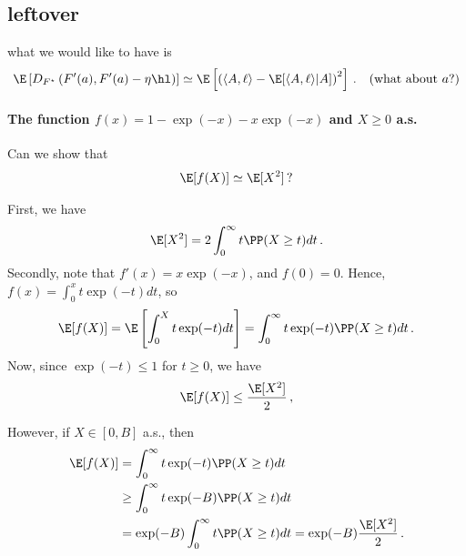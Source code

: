 \subsection{leftover}
what we would like to have is
\begin{align*}
    \E\left[D_{F^\star}\left(F'(a), F'(a) - \eta \hl\right)\right]
                        & \simeq
    \E\left[\left(
        \langle A, \ell \rangle
        -
        \E[
            \langle A, \ell \rangle | A
        ]
    \right)^2\right]\,. & (\text{what about }a?)
\end{align*}
\begin{center}
\end{center}
\paragraph{The function $f(x) = 1 - \exp(-x) - x \exp(-x)$ and $X \geq 0$ a.s.}
Can we show that
\begin{align*}
    \E[f(X)] \simeq \E[X^2]\,?
\end{align*}

First, we have
\begin{align*}
    \E[X^2] = 2 \int_{0}^{\infty} t \PP(X \geq t) dt\,.
\end{align*}
Secondly, note that $f'(x) = x \exp(-x)$, and $f(0) = 0$. Hence,
$f(x) = \int_{0}^x t \exp(-t) dt$, so
\begin{align*}
    \E[f(X)]
    = \E\left[
        \int_0^X t \exp(-t) dt
        \right]
    = \int_0^\infty t \exp(-t) \PP(X \geq t) dt\,.
\end{align*}
Now, since $\exp(-t) \leq 1$ for $t \geq 0$, we have
\begin{align*}
    \E[f(X)] \leq \frac{\E[X^2]}{2}\,,
\end{align*}

However, if $X \in [0, B]$ a.s., then
\begin{align*}
    \E[f(X)]
     & = \int_0^\infty t \exp(-t) \PP(X \geq t) dt                                  \\
     & \geq \int_0^\infty t \exp(-B) \PP(X \geq t) dt                               \\
     & = \exp(-B)  \int_0^\infty t \PP(X \geq t) dt = \exp(-B) \frac{\E[X^2]}{2}\,.
\end{align*}

